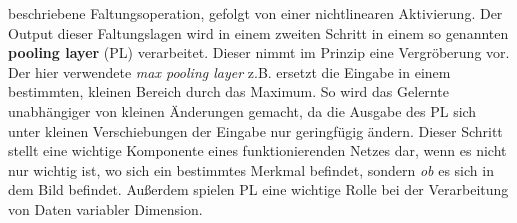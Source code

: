 beschriebene Faltungsoperation, gefolgt von einer nichtlinearen Aktivierung.
Der Output dieser Faltungslagen wird in einem zweiten Schritt in einem so
genannten \textbf{pooling layer} (PL) verarbeitet. Dieser nimmt im Prinzip eine
Vergröberung vor. Der hier verwendete \textit{max pooling layer} z.B. ersetzt
die Eingabe in einem bestimmten, kleinen Bereich durch das Maximum. So wird das
Gelernte unabhängiger von kleinen Änderungen gemacht, da die Ausgabe des PL sich
unter kleinen Verschiebungen der Eingabe nur geringfügig ändern. Dieser Schritt
stellt eine wichtige Komponente eines funktionierenden Netzes dar, wenn es
nicht nur wichtig ist, wo sich ein bestimmtes Merkmal befindet, sondern
\textit{ob} es sich in dem Bild befindet.
Außerdem spielen PL eine wichtige Rolle bei der Verarbeitung von Daten
variabler Dimension.
